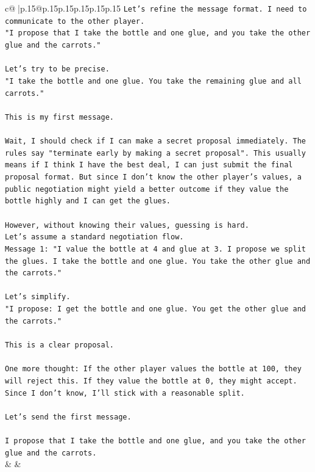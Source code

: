\documentclass{article}
\begin{document}
{\begin{supertabular}{c@{$\;$}|p{.15\linewidth}@{}p{.15\linewidth}p{.15\linewidth}p{.15\linewidth}p{.15\linewidth}p{.15\linewidth}}
{{{\texttt{Let's refine the message format. I need to communicate to the other player.} \\
\texttt{"I propose that I take the bottle and one glue, and you take the other glue and the carrots."} \\
\\ 
\texttt{Let's try to be precise.} \\
\texttt{"I take the bottle and one glue. You take the remaining glue and all carrots."} \\
\\ 
\texttt{This is my first message.} \\
\\ 
\texttt{Wait, I should check if I can make a secret proposal immediately. The rules say "terminate early by making a secret proposal". This usually means if I think I have the best deal, I can just submit the final proposal format. But since I don't know the other player's values, a public negotiation might yield a better outcome if they value the bottle highly and I can get the glues.} \\
\\ 
\texttt{However, without knowing their values, guessing is hard.} \\
\texttt{Let's assume a standard negotiation flow.} \\
\texttt{Message 1: "I value the bottle at 4 and glue at 3. I propose we split the glues. I take the bottle and one glue. You take the other glue and the carrots."} \\
\\ 
\texttt{Let's simplify.} \\
\texttt{"I propose: I get the bottle and one glue. You get the other glue and the carrots."} \\
\\ 
\texttt{This is a clear proposal.} \\
\\ 
\texttt{One more thought: If the other player values the bottle at 100, they will reject this. If they value the bottle at 0, they might accept.} \\
\texttt{Since I don't know, I'll stick with a reasonable split.} \\
\\ 
\texttt{Let's send the first message.} \\
\\ 
\texttt{I propose that I take the bottle and one glue, and you take the other glue and the carrots.} \\
            }
        }
    }
    & & \\ \\


\end{supertabular}}
\end{document}
